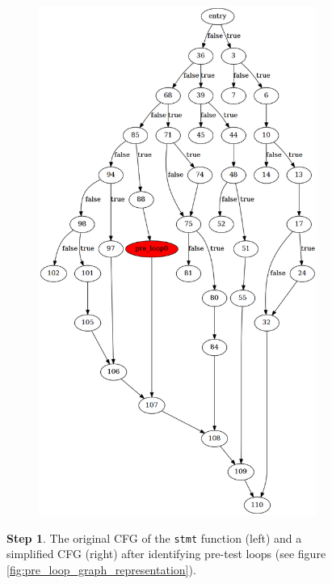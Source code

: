 \begin{figure}[htbp]
\begin{subfigure}[ht]{0.45\textwidth}
		\includegraphics[width=\textwidth]{inc/appendices/control_flow_analysis_example/step1_after.png}
	\end{subfigure}
	\caption{\textbf{Step 1}. The original CFG of the \texttt{stmt} function (left) and a simplified CFG (right) after identifying pre-test loops (see figure \ref{fig:pre_loop_graph_representation}).}
	\label{fig:step_1}
\end{figure}

